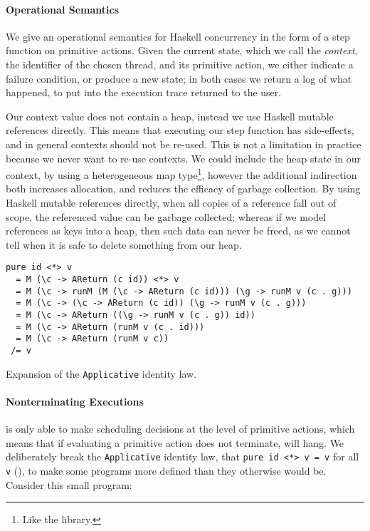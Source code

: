 \paragraph{Operational Semantics}
We give an operational semantics for Haskell concurrency in the form of a step
function on primitive actions.  Given the current state, which we call the
\emph{context}, the identifier of the chosen thread, and its primitive action,
we either indicate a failure condition, or produce a new state; in both cases we
return a log of what happened, to put into the execution trace returned to the
user.

Our context value does not contain a heap, instead we use Haskell mutable
references directly.  This means that executing our step function has
side-effects, and in general contexts should not be re-used.  This is not a
limitation in practice because we never want to re-use contexts.  We could
include the heap state in our context, by using a heterogeneous map
type\footnote{Like the  library.}, however the additional
indirection both increases allocation, and reduces the efficacy of garbage
collection.  By using Haskell mutable references directly, when all copies of a
reference fall out of scope, the referenced value can be garbage collected;
whereas if we model references as keys into a heap, then such data can never be
freed, as we cannot tell when it is safe to delete something from our heap.

\begin{listing}
\begin{verbatim}
pure id <*> v
  = M (\c -> AReturn (c id)) <*> v
  = M (\c -> runM (M (\c -> AReturn (c id))) (\g -> runM v (c . g)))
  = M (\c -> (\c -> AReturn (c id)) (\g -> runM v (c . g)))
  = M (\c -> AReturn ((\g -> runM v (c . g)) id))
  = M (\c -> AReturn (runM v (c . id)))
  = M (\c -> AReturn (runM v c))
 /= v
\end{verbatim}
  \caption{Expansion of the \texttt{Applicative} identity law.}\label{lst:areturn}
\end{listing}

\paragraph{Nonterminating Executions}
\dejafu{} is only able to make scheduling decisions at the level of primitive
actions, which means that if evaluating a primitive action does not terminate,
\dejafu{} will hang.  We deliberately break the \verb|Applicative| identity law,
that \verb|pure id <*> v = v| for all \verb|v| (), to make some
programs more defined than they otherwise would be.  Consider this small
program:

